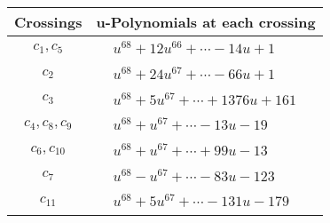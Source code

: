 \documentclass[1p]{elsarticle_modified}
\theoremstyle{definition}
\begin{document}
\begin{tabular}{m{50pt}|m{274pt}}
Crossings & \hspace{64pt}u-Polynomials at each crossing \\
\hline $$\begin{aligned}c_{1},c_{5}\end{aligned}$$&$\begin{aligned}
&u^{68}+12 u^{66}+\cdots-14 u+1
\end{aligned}$\\
\hline $$\begin{aligned}c_{2}\end{aligned}$$&$\begin{aligned}
&u^{68}+24 u^{67}+\cdots-66 u+1
\end{aligned}$\\
\hline $$\begin{aligned}c_{3}\end{aligned}$$&$\begin{aligned}
&u^{68}+5 u^{67}+\cdots+1376 u+161
\end{aligned}$\\
\hline $$\begin{aligned}c_{4},c_{8},c_{9}\end{aligned}$$&$\begin{aligned}
&u^{68}+u^{67}+\cdots-13 u-19
\end{aligned}$\\
\hline $$\begin{aligned}c_{6},c_{10}\end{aligned}$$&$\begin{aligned}
&u^{68}+u^{67}+\cdots+99 u-13
\end{aligned}$\\
\hline $$\begin{aligned}c_{7}\end{aligned}$$&$\begin{aligned}
&u^{68}- u^{67}+\cdots-83 u-123
\end{aligned}$\\
\hline $$\begin{aligned}c_{11}\end{aligned}$$&$\begin{aligned}
&u^{68}+5 u^{67}+\cdots-131 u-179
\end{aligned}$\\
\hline
\end{tabular}\\~\\
\newpage\renewcommand{\arraystretch}{1}
\end{document}
